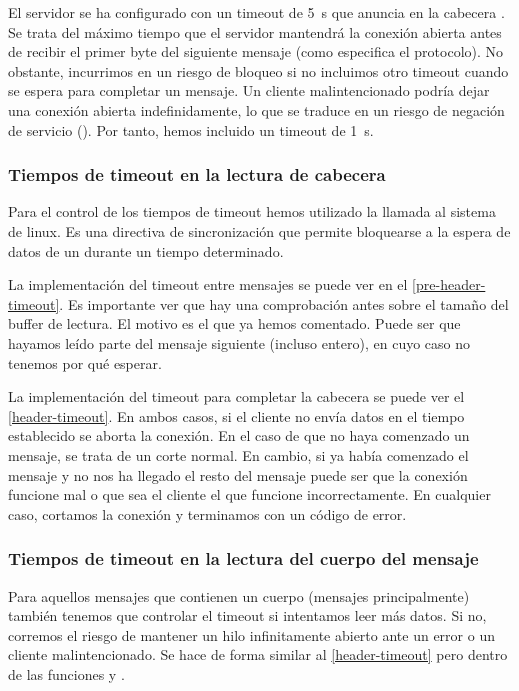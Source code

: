 El servidor se ha configurado con un timeout de \SI{5}{\second} que anuncia en la cabecera . Se trata del máximo tiempo que el servidor mantendrá la conexión abierta antes de recibir el primer byte del siguiente mensaje (como especifica el protocolo). No obstante, incurrimos en un riesgo de bloqueo si no incluimos otro timeout cuando se espera para completar un mensaje. Un cliente malintencionado podría dejar una conexión abierta indefinidamente, lo que se traduce en un riesgo de negación de servicio (). Por tanto, hemos incluido un timeout de \SI{1}{\second}.

\subsubsection{Tiempos de timeout en la lectura de cabecera}
Para el control de los tiempos de timeout hemos utilizado la llamada al sistema  de linux. Es una directiva de sincronización que permite bloquearse a la espera de datos de un  durante un tiempo determinado.

La implementación del timeout entre mensajes se puede ver en el \cref{pre-header-timeout}. Es importante ver que hay una comprobación antes sobre el tamaño del buffer de lectura. El motivo es el que ya hemos comentado. Puede ser que hayamos leído parte del mensaje siguiente (incluso entero), en cuyo caso no tenemos por qué esperar.

La implementación del timeout para completar la cabecera se puede ver el \cref{header-timeout}. En ambos casos, si el cliente no envía datos en el tiempo establecido se aborta la conexión. En el caso de que no haya comenzado un mensaje, se trata de un corte normal. En cambio, si ya había comenzado el mensaje y no nos ha llegado el resto del mensaje puede ser que la conexión funcione mal o que sea el cliente el que funcione incorrectamente. En cualquier caso, cortamos la conexión y terminamos con un código de error.




\subsubsection{Tiempos de timeout en la lectura del cuerpo del mensaje}
Para aquellos mensajes que contienen un cuerpo (mensajes {\POST} principalmente) también tenemos que controlar el timeout si intentamos leer más datos. Si no, corremos el riesgo de mantener un hilo infinitamente abierto ante un error o un cliente malintencionado. Se hace de forma similar al \cref{header-timeout} pero dentro de las funciones  y .

